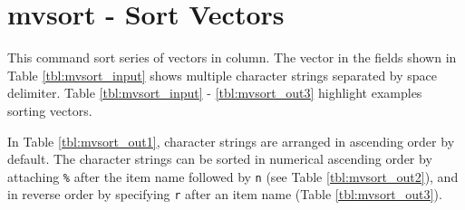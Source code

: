 
%

\section{mvsort - Sort Vectors\label{sect:mvsort}}
This command sort series of vectors in column. 
The vector in the fields shown in Table \ref{tbl:mvsort_input} shows multiple character strings separated by space delimiter. 
Table \ref{tbl:mvsort_input} - \ref{tbl:mvsort_out3} highlight examples sorting vectors. 

In Table \ref{tbl:mvsort_out1}, character strings are arranged in ascending order by default. The character strings can be sorted in numerical ascending order by attaching \verb|%|  after the item name followed by \verb|n| (see Table \ref{tbl:mvsort_out2}), and in reverse order by specifying \verb|r| after an item name (Table \ref{tbl:mvsort_out3}).  

